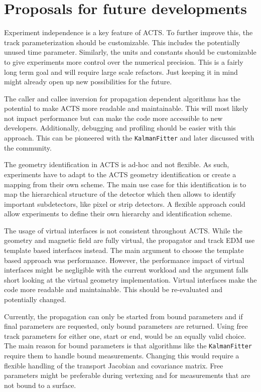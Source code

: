 \section{Proposals for future developments}

Experiment independence is a key feature of ACTS. To further improve this, the track parameterization should be customizable. This includes the potentially unused time parameter. Similarly, the units and constants should be customizable to give experiments more control over the numerical precision. This is a fairly long term goal and will require large scale refactors. Just keeping it in mind might already open up new possibilities for the future.

The caller and callee inversion for propagation dependent algorithms has the potential to make ACTS more readable and maintainable. This will most likely not impact performance but can make the code more accessible to new developers. Additionally, debugging and profiling should be easier with this approach. This can be pioneered with the \texttt{KalmanFitter} and later discussed with the community.

The geometry identification in ACTS is ad-hoc and not flexible. As such, experiments have to adapt to the ACTS geometry identification or create a mapping from their own scheme. The main use case for this identification is to map the hierarchical structure of the detector which then allows to identify important subdetectors, like pixel or strip detectors. A flexible approach could allow experiments to define their own hierarchy and identification scheme.

The usage of virtual interfaces is not consistent throughout ACTS. While the geometry and magnetic field are fully virtual, the propagator and track EDM use template based interfaces instead. The main argument to choose the template based approach was performance. However, the performance impact of virtual interfaces might be negligible with the current workload and the argument falls short looking at the virtual geometry implementation. Virtual interfaces make the code more readable and maintainable. This should be re-evaluated and potentially changed.

Currently, the propagation can only be started from bound parameters and if final parameters are requested, only bound parameters are returned. Using free track parameters for either one, start or end, would be an equally valid choice. The main reason for bound parameters is that algorithms like the \texttt{KalmanFitter} require them to handle bound measurements. Changing this would require a flexible handling of the transport Jacobian and covariance matrix. Free parameters might be preferable during vertexing and for measurements that are not bound to a surface.
